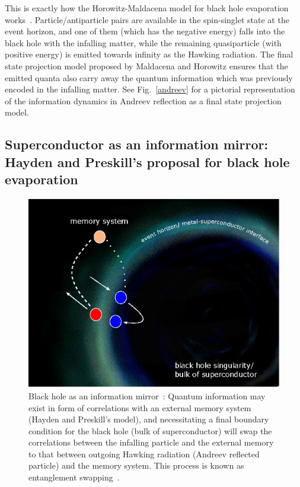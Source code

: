\documentclass[12pt,letterpaper,aps,onecolumn,superscriptaddress,floatfix,notitlepage]{revtex4-1}
\begin{document}
	This is exactly how the Horowitz-Maldacena model for black hole evaporation works~\cite{horowitz}. Particle/antiparticle pairs are available in the spin-singlet state at the event horizon, and one of them (which has the negative energy) falls into the black hole with the infalling matter, while the remaining quasiparticle (with positive energy) is emitted towards infinity as the Hawking radiation. The final state projection model proposed by Maldacena and Horowitz ensures that the emitted quanta also carry away the quantum information which was previously encoded in the infalling matter. See Fig.~\ref{andreev} for a pictorial representation of the information dynamics in Andreev reflection as a final state projection model.
	\subsection{Superconductor as an information mirror: Hayden and Preskill's proposal for black hole evaporation}
	\begin{figure}
		\includegraphics[scale=0.6]{fig4.eps}
		\caption{Black hole as an information mirror~\cite{projection,preskill}: Quantum information may exist in form of correlations with an external memory system (Hayden and Preskill's model), and necessitating a final boundary condition for the black hole (bulk of superconductor) will swap the correlations between the infalling particle and the external memory to that between outgoing Hawking radiation (Andreev reflected particle) and the memory system. This process is known as entanglement swapping~\cite{zukowski1993event}.\label{mirror}}
	\end{figure}    
\end{document}
